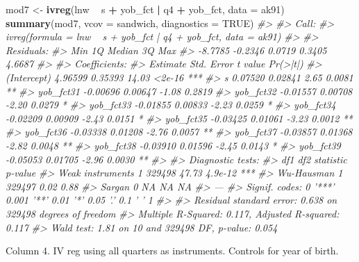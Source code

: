 \documentclass[]{book}
\newenvironment{Shaded}{\begin{snugshade}}{\end{snugshade}}
\newcommand{\CommentTok}[1]{\textcolor[rgb]{0.56,0.35,0.01}{\textit{#1}}}
\newcommand{\DataTypeTok}[1]{\textcolor[rgb]{0.13,0.29,0.53}{#1}}
\newcommand{\KeywordTok}[1]{\textcolor[rgb]{0.13,0.29,0.53}{\textbf{#1}}}
\newcommand{\NormalTok}[1]{#1}
\newcommand{\OperatorTok}[1]{\textcolor[rgb]{0.81,0.36,0.00}{\textbf{#1}}}
\newcommand{\OtherTok}[1]{\textcolor[rgb]{0.56,0.35,0.01}{#1}}
\newcommand{\StringTok}[1]{\textcolor[rgb]{0.31,0.60,0.02}{#1}}
\theoremstyle{definition}
\theoremstyle{definition}
\theoremstyle{definition}
\theoremstyle{remark}
\begin{document}
\begin{Shaded}
\begin{Highlighting}[]
\NormalTok{mod7 <-}\StringTok{ }\KeywordTok{ivreg}\NormalTok{(lnw }\OperatorTok{~}\StringTok{ }\NormalTok{s }\OperatorTok{+}\StringTok{ }\NormalTok{yob_fct }\OperatorTok{|}\StringTok{ }\NormalTok{q4 }\OperatorTok{+}\StringTok{ }\NormalTok{yob_fct, }\DataTypeTok{data =}\NormalTok{ ak91)}
\KeywordTok{summary}\NormalTok{(mod7, }\DataTypeTok{vcov =}\NormalTok{ sandwich, }\DataTypeTok{diagnostics =} \OtherTok{TRUE}\NormalTok{)}
\CommentTok{#> }
\CommentTok{#> Call:}
\CommentTok{#> ivreg(formula = lnw ~ s + yob_fct | q4 + yob_fct, data = ak91)}
\CommentTok{#> }
\CommentTok{#> Residuals:}
\CommentTok{#>     Min      1Q  Median      3Q     Max }
\CommentTok{#> -8.7785 -0.2346  0.0719  0.3405  4.6687 }
\CommentTok{#> }
\CommentTok{#> Coefficients:}
\CommentTok{#>             Estimate Std. Error t value Pr(>|t|)    }
\CommentTok{#> (Intercept)  4.96599    0.35393   14.03   <2e-16 ***}
\CommentTok{#> s            0.07520    0.02841    2.65   0.0081 ** }
\CommentTok{#> yob_fct31   -0.00696    0.00647   -1.08   0.2819    }
\CommentTok{#> yob_fct32   -0.01557    0.00708   -2.20   0.0279 *  }
\CommentTok{#> yob_fct33   -0.01855    0.00833   -2.23   0.0259 *  }
\CommentTok{#> yob_fct34   -0.02209    0.00909   -2.43   0.0151 *  }
\CommentTok{#> yob_fct35   -0.03425    0.01061   -3.23   0.0012 ** }
\CommentTok{#> yob_fct36   -0.03338    0.01208   -2.76   0.0057 ** }
\CommentTok{#> yob_fct37   -0.03857    0.01368   -2.82   0.0048 ** }
\CommentTok{#> yob_fct38   -0.03910    0.01596   -2.45   0.0143 *  }
\CommentTok{#> yob_fct39   -0.05053    0.01705   -2.96   0.0030 ** }
\CommentTok{#> }
\CommentTok{#> Diagnostic tests:}
\CommentTok{#>                     df1    df2 statistic p-value    }
\CommentTok{#> Weak instruments      1 329498     47.73 4.9e-12 ***}
\CommentTok{#> Wu-Hausman            1 329497      0.02    0.88    }
\CommentTok{#> Sargan                0     NA        NA      NA    }
\CommentTok{#> ---}
\CommentTok{#> Signif. codes:  0 '***' 0.001 '**' 0.01 '*' 0.05 '.' 0.1 ' ' 1}
\CommentTok{#> }
\CommentTok{#> Residual standard error: 0.638 on 329498 degrees of freedom}
\CommentTok{#> Multiple R-Squared: 0.117,   Adjusted R-squared: 0.117 }
\CommentTok{#> Wald test: 1.81 on 10 and 329498 DF,  p-value: 0.054}
\end{Highlighting}
\end{Shaded}

Column 4. IV reg using all quarters as instruments. Controls for year of
birth.
\end{document}
